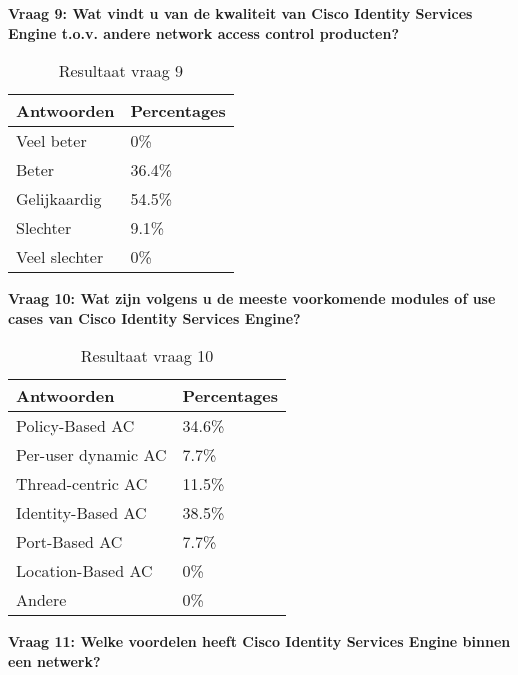 \textbf{Vraag 9: Wat vindt u van de kwaliteit van Cisco Identity Services Engine t.o.v. andere network access control producten?}
\begin{table}[h!]
	\begin{center}
		\begin{tabular}{|l|l|}
			\hline
			\bf Antwoorden    & \bf Percentages \\ \hline
			Veel beter    & 0\%    \\ \hline
			Beter         & 36.4\% \\ \hline
			Gelijkaardig  & 54.5\% \\ \hline
			Slechter      & 9.1\%  \\ \hline
			Veel slechter & 0\%    \\ \hline                                                                                                                                 
		\end{tabular}
		\caption{Resultaat vraag 9}
	\end{center}
\end{table}



\newpage
\textbf{Vraag 10: Wat zijn volgens u de meeste voorkomende modules of use cases van Cisco Identity Services Engine?}

\begin{table}[H]
	\begin{center}
		\begin{tabular}{|l|l|}
			\hline
			\bf Antwoorden          & \bf Percentages \\ \hline
			Policy-Based AC     & 34.6\%      \\ \hline
			Per-user dynamic AC & 7.7\%       \\ \hline
			Thread-centric AC   & 11.5\%      \\ \hline
			Identity-Based AC   & 38.5\%      \\ \hline
			Port-Based AC       & 7.7\%       \\ \hline
			Location-Based AC   & 0\%         \\ \hline
			Andere              & 0\%         \\ \hline                                                        
		\end{tabular}
		\caption{Resultaat vraag 10}
	\end{center}
\end{table}


\textbf{Vraag 11: Welke voordelen heeft Cisco Identity Services Engine binnen een netwerk?}

